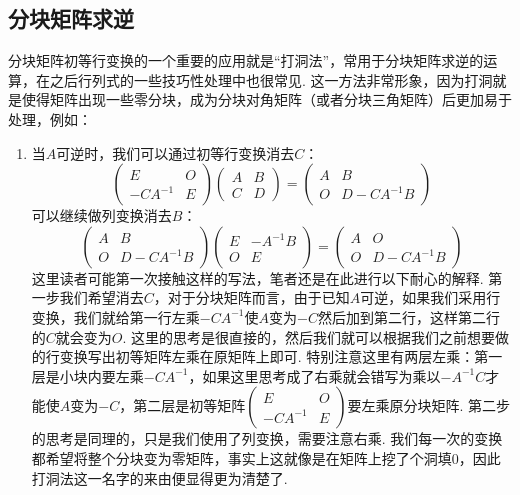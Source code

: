 \subsection{分块矩阵求逆}

分块矩阵初等行变换的一个重要的应用就是``打洞法''，常用于分块矩阵求逆的运算，在之后行列式的一些技巧性处理中也很常见. 这一方法非常形象，因为打洞就是使得矩阵出现一些零分块，成为分块对角矩阵（或者分块三角矩阵）后更加易于处理，例如：
\begin{enumerate}
    \item 当$A$可逆时，我们可以通过初等行变换消去$C$：
          \[ \begin{pmatrix}
                  E & O \\ -CA^{-1} & E
              \end{pmatrix}\begin{pmatrix}
                  A & B \\ C & D
              \end{pmatrix}=\begin{pmatrix}
                  A & B \\ O & D-CA^{-1}B
              \end{pmatrix} \]
          可以继续做列变换消去$B$：
          \[ \begin{pmatrix}
                  A & B \\ O & D-CA^{-1}B
              \end{pmatrix}\begin{pmatrix}
                  E & -A^{-1}B \\ O & E
              \end{pmatrix}=\begin{pmatrix}
                  A & O \\ O & D-CA^{-1}B
              \end{pmatrix} \]
          这里读者可能第一次接触这样的写法，笔者还是在此进行以下耐心的解释. 第一步我们希望消去$C$，对于分块矩阵而言，由于已知$A$可逆，如果我们采用行变换，我们就给第一行左乘$-CA^{-1}$使$A$变为$-C$然后加到第二行，这样第二行的$C$就会变为$O$. 这里的思考是很直接的，然后我们就可以根据我们之前想要做的行变换写出初等矩阵左乘在原矩阵上即可. 特别注意这里有两层左乘：第一层是小块内要左乘$-CA^{-1}$，如果这里思考成了右乘就会错写为乘以$-A^{-1}C$才能使$A$变为$-C$，第二层是初等矩阵$\begin{pmatrix}
                  E & O \\ -CA^{-1} & E
              \end{pmatrix}$要左乘原分块矩阵. 第二步的思考是同理的，只是我们使用了列变换，需要注意右乘. 我们每一次的变换都希望将整个分块变为零矩阵，事实上这就像是在矩阵上挖了个洞填0，因此打洞法这一名字的来由便显得更为清楚了.


\end{enumerate}
